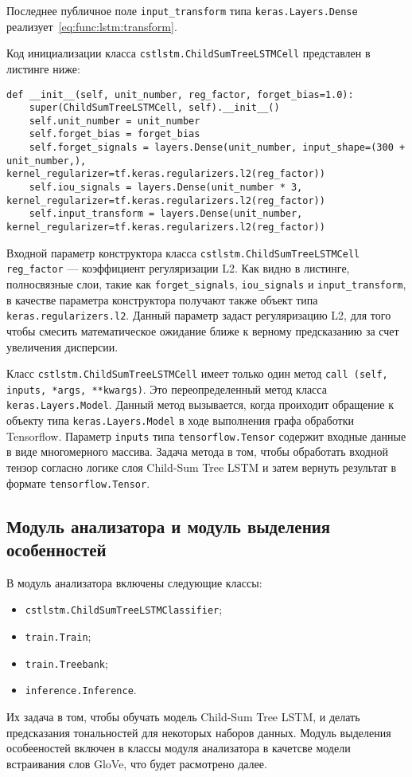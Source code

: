 Последнее публичное поле \texttt{input\_transform} типа \texttt{keras.Layers.Den\-se} реализует~\ref{eq:func:lstm:transform}.

Код инициализации класса \texttt{cstlstm.ChildSumTreeLSTMCell} представлен в листинге ниже:

\medskip
\begin{lstlisting}[style=Python]
  def __init__(self, unit_number, reg_factor, forget_bias=1.0):
    super(ChildSumTreeLSTMCell, self).__init__()
    self.unit_number = unit_number
    self.forget_bias = forget_bias
    self.forget_signals = layers.Dense(unit_number, input_shape=(300 + unit_number,), kernel_regularizer=tf.keras.regularizers.l2(reg_factor))
    self.iou_signals = layers.Dense(unit_number * 3, kernel_regularizer=tf.keras.regularizers.l2(reg_factor))
    self.input_transform = layers.Dense(unit_number, kernel_regularizer=tf.keras.regularizers.l2(reg_factor))
\end{lstlisting}
\medskip

Входной параметр конструктора класса \texttt{cstlstm.ChildSumTreeLSTM\-Cell} \texttt{reg\_factor} --- коэффициент регуляризации L2. Как видно в листинге, полносвязные слои, такие как \texttt{forget\_signals}, \texttt{iou\_signals} и \texttt{input\_trans\-form}, в качестве параметра конструктора получают также объект типа \texttt{ke\-ras.regularizers.l2}. Данный параметр задаст регуляризацию L2, для того чтобы смесить математическое ожидание ближе к верному предсказанию за счет увеличения дисперсии.

Класс \texttt{cstlstm.ChildSumTreeLSTMCell} имеет только один метод \texttt{call (self, inputs, *args, **kwargs)}. Это переопределенный метод класса \texttt{keras.Layers.Model}. Данный метод вызывается, когда проиходит обращение к объекту типа \texttt{keras.Layers.Model} в ходе выполнения графа обработки Tensorflow. Параметр \texttt{inputs} типа \texttt{tensorflow.Tensor} содержит входные данные в виде многомерного массива. Задача метода в том, чтобы обработать входной тензор согласно логике слоя Child-Sum Tree LSTM и затем вернуть результат в формате \texttt{tensorflow.Tensor}.

\subsection{Модуль анализатора и модуль выделения особенностей}
В модуль анализатора включены следующие классы:
\begin{itemize}
\item \texttt{cstlstm.ChildSumTreeLSTMClassifier};
\item \texttt{train.Train};
\item \texttt{train.Treebank};
\item \texttt{inference.Inference}.
\end{itemize}
Их задача в том, чтобы обучать модель Child-Sum Tree LSTM, и делать предсказания тональностей для некоторых наборов данных. Модуль выделения особееностей включен в классы модуля анализатора в качетсве модели встраивания слов GloVe, что будет расмотрено далее.

